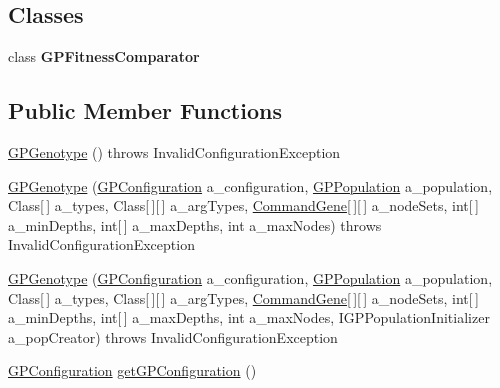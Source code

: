 \subsection*{Classes}
\begin{DoxyCompactItemize}
\item 
class {\bfseries G\-P\-Fitness\-Comparator}
\end{DoxyCompactItemize}
\subsection*{Public Member Functions}
\begin{DoxyCompactItemize}
\item 
\hyperlink{classorg_1_1jgap_1_1gp_1_1impl_1_1_g_p_genotype_a66b8b63a2379f9b4f4e94ee3cc6974ad}{G\-P\-Genotype} ()  throws Invalid\-Configuration\-Exception 
\item 
\hyperlink{classorg_1_1jgap_1_1gp_1_1impl_1_1_g_p_genotype_a470bc360f57da2d313df69c51f9e7c3e}{G\-P\-Genotype} (\hyperlink{classorg_1_1jgap_1_1gp_1_1impl_1_1_g_p_configuration}{G\-P\-Configuration} a\-\_\-configuration, \hyperlink{classorg_1_1jgap_1_1gp_1_1impl_1_1_g_p_population}{G\-P\-Population} a\-\_\-population, Class\mbox{[}$\,$\mbox{]} a\-\_\-types, Class\mbox{[}$\,$\mbox{]}\mbox{[}$\,$\mbox{]} a\-\_\-arg\-Types, \hyperlink{classorg_1_1jgap_1_1gp_1_1_command_gene}{Command\-Gene}\mbox{[}$\,$\mbox{]}\mbox{[}$\,$\mbox{]} a\-\_\-node\-Sets, int\mbox{[}$\,$\mbox{]} a\-\_\-min\-Depths, int\mbox{[}$\,$\mbox{]} a\-\_\-max\-Depths, int a\-\_\-max\-Nodes)  throws Invalid\-Configuration\-Exception 
\item 
\hyperlink{classorg_1_1jgap_1_1gp_1_1impl_1_1_g_p_genotype_a71854e2aa9fc4e178a0c768efe9c80ad}{G\-P\-Genotype} (\hyperlink{classorg_1_1jgap_1_1gp_1_1impl_1_1_g_p_configuration}{G\-P\-Configuration} a\-\_\-configuration, \hyperlink{classorg_1_1jgap_1_1gp_1_1impl_1_1_g_p_population}{G\-P\-Population} a\-\_\-population, Class\mbox{[}$\,$\mbox{]} a\-\_\-types, Class\mbox{[}$\,$\mbox{]}\mbox{[}$\,$\mbox{]} a\-\_\-arg\-Types, \hyperlink{classorg_1_1jgap_1_1gp_1_1_command_gene}{Command\-Gene}\mbox{[}$\,$\mbox{]}\mbox{[}$\,$\mbox{]} a\-\_\-node\-Sets, int\mbox{[}$\,$\mbox{]} a\-\_\-min\-Depths, int\mbox{[}$\,$\mbox{]} a\-\_\-max\-Depths, int a\-\_\-max\-Nodes, I\-G\-P\-Population\-Initializer a\-\_\-pop\-Creator)  throws Invalid\-Configuration\-Exception 
\item 
\hyperlink{classorg_1_1jgap_1_1gp_1_1impl_1_1_g_p_configuration}{G\-P\-Configuration} \hyperlink{classorg_1_1jgap_1_1gp_1_1impl_1_1_g_p_genotype_a318ae291daca64dc4ba0b1e5085b4b87}{get\-G\-P\-Configuration} ()

\end{DoxyCompactItemize}
